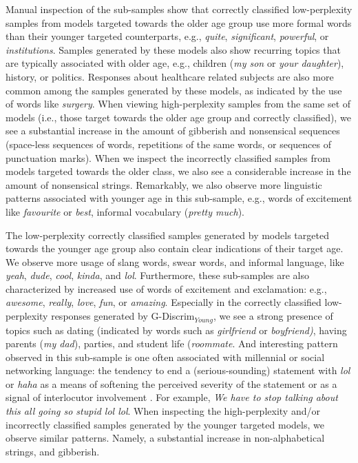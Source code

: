 Manual inspection of the sub-samples show that correctly classified low-perplexity samples from models targeted towards the older age group use more formal words than their younger targeted counterparts, e.g., \textit{quite}, \textit{significant}, \textit{powerful}, or \textit{institutions}. Samples generated by these models also show recurring topics that are typically associated with older age, e.g., children (\textit{my son} or \textit{your daughter}), history, or politics. Responses about healthcare related subjects are also more common among the samples generated by these models, as indicated by the use of words like \textit{surgery}. When viewing high-perplexity samples from the same set of models (i.e., those target towards the older age group and correctly classified), we see a substantial increase in the amount of gibberish and nonsensical sequences (space-less sequences of words, repetitions of the same words, or sequences of punctuation marks). When we inspect the incorrectly classified samples from models targeted towards the older class, we also see a considerable increase in the amount of nonsensical strings. Remarkably, we also observe more linguistic patterns associated with younger age in this sub-sample, e.g., words of excitement like \textit{favourite} or \textit{best}, informal vocabulary (\textit{pretty much}).

The low-perplexity correctly classified samples generated by models targeted towards the younger age group also contain clear indications of their target age. We observe more usage of slang words, swear words, and informal language, like \textit{yeah}, \textit{dude}, \textit{cool}, \textit{kinda}, and \textit{lol}. 
Furthermore, these sub-samples are also characterized by increased use of words of excitement and exclamation: e.g., \textit{awesome}, \textit{really}, \textit{love}, \textit{fun}, or \textit{amazing}. Especially in the correctly classified low-perplexity responses generated by G-Discrim$_{Young}$, we see a strong presence of topics such as dating (indicated by words such as \textit{girlfriend} or \textit{boyfriend)}, having parents (\textit{my dad}), parties, and student life (\textit{roommate}. And interesting pattern observed in this sub-sample is one often associated with millennial or social networking language: the tendency to end a (serious-sounding) statement with \textit{lol} or \textit{haha} as a means of softening the perceived severity of the statement or as a signal of interlocutor involvement \citep{newitz2019you, tagliamonte2008linguistic}. For example, \textit{We have to stop talking about this all going so stupid lol lol}. When inspecting the high-perplexity and/or incorrectly classified samples generated by the younger targeted models, we observe similar patterns. Namely, a substantial increase in non-alphabetical strings, and gibberish.

